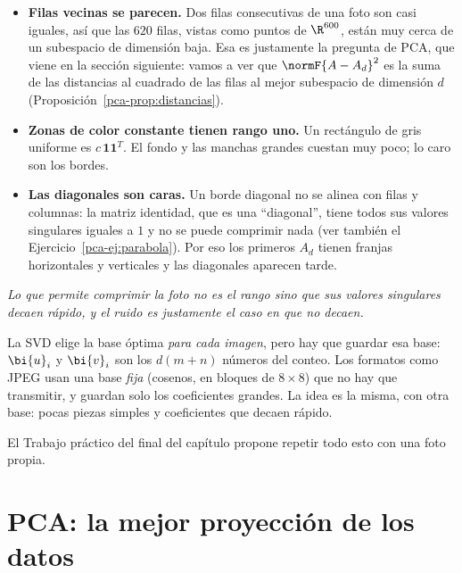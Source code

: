\begin{itemize}[leftmargin=*,itemsep=1pt]
\item \textbf{Filas vecinas se parecen.} Dos filas consecutivas de una foto
son casi iguales, así que las $620$ filas, vistas como puntos de $\R^{600}$,
están muy cerca de un subespacio de dimensión baja. Esa es justamente la
pregunta de PCA, que viene en la sección siguiente: vamos a ver que
$\normF{A-A_d}^2$ es la suma de las distancias al cuadrado de las filas al mejor
subespacio de dimensión $d$ (Proposición~\ref{pca-prop:distancias}).
\item \textbf{Zonas de color constante tienen rango uno.} Un rectángulo de
gris uniforme es $c\,\mathbf 1\mathbf 1^T$. El fondo y las manchas
grandes cuestan muy poco; lo caro son los bordes.
\item \textbf{Las diagonales son caras.} Un borde diagonal no se alinea con
filas y columnas: la matriz identidad, que es una ``diagonal'', tiene todos
sus valores singulares iguales a $1$ y no se puede comprimir nada
(ver también el Ejercicio~\ref{pca-ej:parabola}). Por
eso los primeros $A_d$ tienen franjas horizontales y verticales y las
diagonales aparecen tarde.
\end{itemize}

\begin{center}
\begin{minipage}{0.85\textwidth}
\centering\emph{Lo que permite comprimir la foto no es el rango sino que sus
valores singulares decaen rápido, y el ruido es justamente el caso en que no
decaen.}
\end{minipage}
\end{center}

\begin{remark}
La SVD elige la base óptima \emph{para cada imagen}, pero hay que guardar esa
base: $\bi{u}_i$ y $\bi{v}_i$ son los $d(m+n)$ números del conteo. Los formatos como
JPEG usan una base \emph{fija} (cosenos, en bloques de $8\times8$) que no hay
que transmitir, y guardan solo los coeficientes grandes. La idea es la misma,
con otra base: pocas piezas simples y coeficientes que decaen rápido.
\end{remark}

El Trabajo práctico del final del capítulo propone repetir todo esto con una
foto propia.

\section{PCA: la mejor proyección de los datos}\label{pca-sec:pca}

